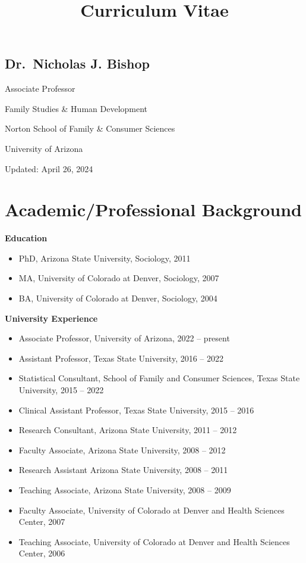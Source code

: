 \documentclass[
]{article}
\title{Curriculum Vitae}
\author{}
\date{\vspace{-2.5em}}
\begin{document}
\maketitle

\hypertarget{dr.-nicholas-j.-bishop}{%
\subsection{\texorpdfstring{\textbf{Dr.~Nicholas J.
Bishop}}{Dr.~Nicholas J. Bishop}}\label{dr.-nicholas-j.-bishop}}

Associate Professor

Family Studies \& Human Development

Norton School of Family \& Consumer Sciences

University of Arizona

Updated: April 26, 2024

\hypertarget{academicprofessional-background}{%
\section{\texorpdfstring{\textbf{Academic/Professional
Background}}{Academic/Professional Background}}\label{academicprofessional-background}}

\textbf{Education}

\begin{itemize}
\item
  PhD, Arizona State University, Sociology, 2011
\item
  MA, University of Colorado at Denver, Sociology, 2007
\item
  BA, University of Colorado at Denver, Sociology, 2004
\end{itemize}

\textbf{University Experience}

\begin{itemize}
\item
  Associate Professor, University of Arizona, 2022 -- present
\item
  Assistant Professor, Texas State University, 2016 -- 2022
\item
  Statistical Consultant, School of Family and Consumer Sciences, Texas
  State University, 2015 -- 2022
\item
  Clinical Assistant Professor, Texas State University, 2015 -- 2016
\item
  Research Consultant, Arizona State University, 2011 -- 2012
\item
  Faculty Associate, Arizona State University, 2008 -- 2012
\item
  Research Assistant Arizona State University, 2008 -- 2011
\item
  Teaching Associate, Arizona State University, 2008 -- 2009
\item
  Faculty Associate, University of Colorado at Denver and Health
  Sciences Center, 2007
\item
  Teaching Associate, University of Colorado at Denver and Health
  Sciences Center, 2006
\end{itemize}
\end{document}
